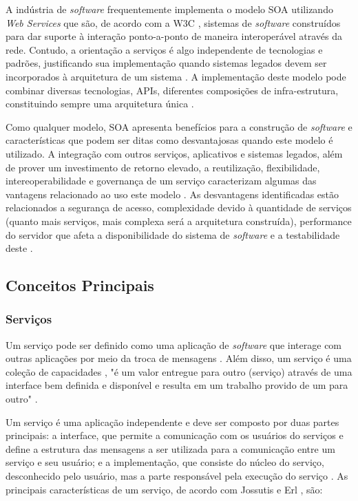 A indústria de \textit{software} frequentemente implementa o modelo SOA utilizando \textit{Web Services} que são, de acordo com a W3C \cite{haas_web_2004}, sistemas de \textit{software} construídos para dar suporte à interação ponto-a-ponto de maneira interoperável através da rede. Contudo, a orientação a serviços é algo independente de tecnologias e padrões, justificando sua implementação quando sistemas legados devem ser incorporados à arquitetura de um sistema \cite{linthicum_soainrealworld_2007}. A implementação deste modelo pode combinar diversas tecnologias, APIs, diferentes composições de infra-estrutura, constituindo sempre uma arquitetura única \cite{erl_orientacaoaservico_2009}.

Como qualquer modelo, SOA apresenta benefícios para a construção de \textit{software} e características que podem ser ditas como desvantajosas quando este modelo é utilizado. A integração com outros serviços, aplicativos e sistemas legados, além de prover um investimento de retorno elevado, a reutilização, flexibilidade, intereoperabilidade e governança de um serviço caracterizam algumas das vantagens relacionado ao uso este modelo \cite{oqueesoa_2010} \cite{vantagens_desvantagens_soa}. As desvantagens identificadas estão relacionados a segurança de acesso, complexidade devido à quantidade de serviços (quanto mais serviços, mais complexa será a arquitetura construída), performance do servidor que afeta a disponibilidade do sistema de \textit{software} e a testabilidade deste \cite{oqueesoa_2010} \cite{vantagens_desvantagens_soa}.

\subsection{Conceitos Principais}
\subsubsection{Serviços}

Um serviço pode ser definido como uma aplicação de \textit{software} que interage com outras aplicações por meio da troca de mensagens \cite{linthicum_soainrealworld_2007}. Além disso, um serviço é uma coleção de capacidades \cite{erl_orientacaoaservico_2009}, "é um valor entregue para outro (serviço) através de uma interface bem definida e disponível e resulta em um trabalho provido de um para outro" \cite{adaptive_ltd_service_2009}.

Um serviço é uma aplicação independente e deve ser composto por duas partes principais: a interface, que permite a comunicação com os usuários do serviços e define a estrutura das mensagens a ser utilizada para a comunicação entre um serviço e seu usuário; e a implementação, que consiste do núcleo do serviço, desconhecido pelo usuário, mas a parte responsável pela execução do serviço \cite{linthicum_soainrealworld_2007}. As principais características de um serviço, de acordo com Jossutis \cite{josuttis_soa_2007} e Erl \cite{erl_orientacaoaservico_2009}, são:

